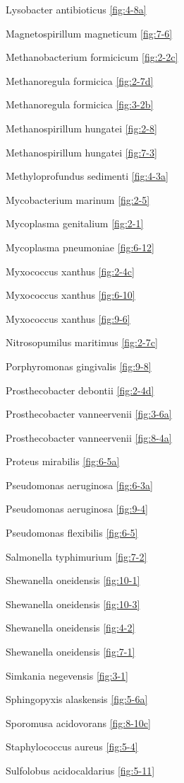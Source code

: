 \documentclass[]{tufte-book}
\begin{document}
Lysobacter antibioticus \ref{fig:4-8a}

Magnetospirillum magneticum \ref{fig:7-6}

Methanobacterium formicicum \ref{fig:2-2c}

Methanoregula formicica \ref{fig:2-7d}

Methanoregula formicica \ref{fig:3-2b}

Methanospirillum hungatei \ref{fig:2-8}

Methanospirillum hungatei \ref{fig:7-3}

Methyloprofundus sedimenti \ref{fig:4-3a}

Mycobacterium marinum \ref{fig:2-5}

Mycoplasma genitalium \ref{fig:2-1}

Mycoplasma pneumoniae \ref{fig:6-12}

Myxococcus xanthus \ref{fig:2-4c}

Myxococcus xanthus \ref{fig:6-10}

Myxococcus xanthus \ref{fig:9-6}

Nitrosopumilus maritimus \ref{fig:2-7c}

Porphyromonas gingivalis \ref{fig:9-8}

Prosthecobacter debontii \ref{fig:2-4d}

Prosthecobacter vanneervenii \ref{fig:3-6a}

Prosthecobacter vanneervenii \ref{fig:8-4a}

Proteus mirabilis \ref{fig:6-5a}

Pseudomonas aeruginosa \ref{fig:6-3a}

Pseudomonas aeruginosa \ref{fig:9-4}

Pseudomonas flexibilis \ref{fig:6-5}

Salmonella typhimurium \ref{fig:7-2}

Shewanella oneidensis \ref{fig:10-1}

Shewanella oneidensis \ref{fig:10-3}

Shewanella oneidensis \ref{fig:4-2}

Shewanella oneidensis \ref{fig:7-1}

Simkania negevensis \ref{fig:3-1}

Sphingopyxis alaskensis \ref{fig:5-6a}

Sporomusa acidovorans \ref{fig:8-10c}

Staphylococcus aureus \ref{fig:5-4}

Sulfolobus acidocaldarius \ref{fig:5-11}
\end{document}
